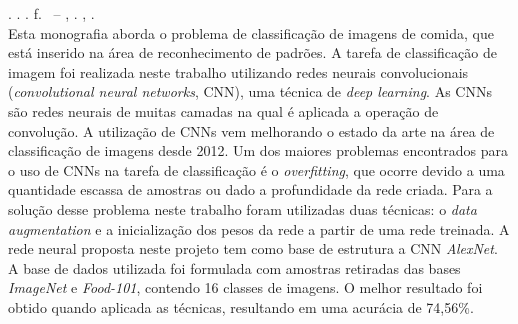 
\begin{resumo}[RESUMO]
\begin{SingleSpacing}

\imprimirautorcitacao. \imprimirtitulo. \imprimirdata. \pageref {LastPage} f. \imprimirprojeto\ – \imprimirprograma, \imprimirinstituicao. \imprimirlocal, \imprimirdata.\\


Esta monografia aborda o problema de classificação de imagens de comida, que está inserido na área de reconhecimento de padrões. A tarefa de classificação de imagem foi realizada neste trabalho utilizando redes neurais convolucionais (\textit{convolutional neural networks}, CNN), uma técnica de \textit{deep learning}. As CNNs são redes neurais de muitas camadas na qual é aplicada a operação de convolução. A utilização de CNNs vem melhorando o estado da arte na área de classificação de imagens desde 2012. Um dos maiores problemas encontrados para o uso de CNNs na tarefa de classificação é o \textit{overfitting}, que ocorre devido a uma quantidade escassa de amostras ou dado a profundidade da rede criada. Para a solução desse problema neste trabalho foram utilizadas duas técnicas: o \textit{data augmentation} e a inicialização dos pesos da rede a partir de uma rede treinada. A rede neural proposta neste projeto tem como base de estrutura a CNN \textit{AlexNet}. A base de dados utilizada foi formulada com amostras retiradas das bases \textit{ImageNet} e \textit{Food-101}, contendo 16 classes de imagens. O melhor resultado foi obtido quando aplicada as técnicas, resultando em uma acurácia de 74,56\%.





\end{SingleSpacing}
\end{resumo}
